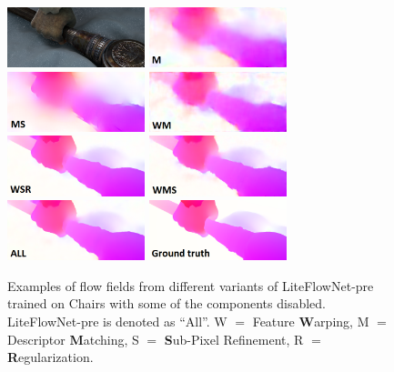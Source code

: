 \documentclass[10pt,twocolumn,letterpaper]{article}
\begin{document}
\begin{figure}[ht]
\centering
   \includegraphics[width=4cm]{figure/MPICleanTrain248.png}
   \includegraphics[width=4cm]{figure/LiteFlowNet-pre-M-MPICleanTrain248.png} 
   \includegraphics[width=4cm]{figure/LiteFlowNet-pre-MS-MPICleanTrain248.png} 
   \includegraphics[width=4cm]{figure/LiteFlowNet-pre-WM-MPICleanTrain248.png}\\
   \includegraphics[width=4cm]{figure/LiteFlowNet-pre-WSR-MPICleanTrain248.png} 
   \includegraphics[width=4cm]{figure/LiteFlowNet-pre-WMS-MPICleanTrain248.png}
   \includegraphics[width=4cm]{figure/LiteFlowNet-pre-MPICleanTrain248.png}
   \includegraphics[width=4cm]{figure/GT-MPICleanTrain248.png}
\caption{Examples of flow fields from different variants of LiteFlowNet-pre trained on Chairs with some of the components disabled. LiteFlowNet-pre is denoted as ``All''. W $=$ Feature \textbf{W}arping, M $=$ Descriptor \textbf{M}atching, S $=$ \textbf{S}ub-Pixel Refinement, R $=$ \textbf{R}egularization.}
\label{fig:ablation flows}
\end{figure}
\end{document}

